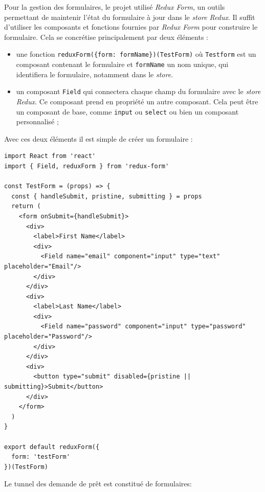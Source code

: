 \bigskip

Pour la gestion des formulaires, le projet utilisé \emph{Redux Form}, un
outils permettant de maintenir l'état du formulaire à jour dans le
\emph{store Redux}. Il suffit d'utiliser les composants et fonctions
fournies par \emph{Redux Form} pour construire le formulaire. Cela se
concrétise principalement par deux éléments :

\begin{itemize}
\tightlist
\item
  une fonction
  \texttt{reduxForm(\{form:\ \textquotesingle{}formName\textquotesingle{}\})(TestForm)}
  où \texttt{Testform} est un composant contenant le formulaire et
  \texttt{formName} un nom unique, qui identifiera le formulaire,
  notamment dans le \emph{store}.
\item
  un composant \texttt{Field} qui connectera chaque champ du formulaire
  avec le \emph{store Redux}. Ce composant prend en propriété un autre
  composant. Cela peut être un composant de base, comme \texttt{input}
  ou \texttt{select} ou bien un composant personnalisé ;
\end{itemize}

Avec ces deux éléments il est simple de créer un formulaire :

\begin{verbatim}
import React from 'react'
import { Field, reduxForm } from 'redux-form'

const TestForm = (props) => {
  const { handleSubmit, pristine, submitting } = props
  return (
    <form onSubmit={handleSubmit}>
      <div>
        <label>First Name</label>
        <div>
          <Field name="email" component="input" type="text" placeholder="Email"/>
        </div>
      </div>
      <div>
        <label>Last Name</label>
        <div>
          <Field name="password" component="input" type="password" placeholder="Password"/>
        </div>
      </div>
      <div>
        <button type="submit" disabled={pristine || submitting}>Submit</button>
      </div>
    </form>
  )
}

export default reduxForm({
  form: 'testForm'
})(TestForm)
\end{verbatim}

\bigskip

Le tunnel des demande de prêt est constitué de formulaires:

